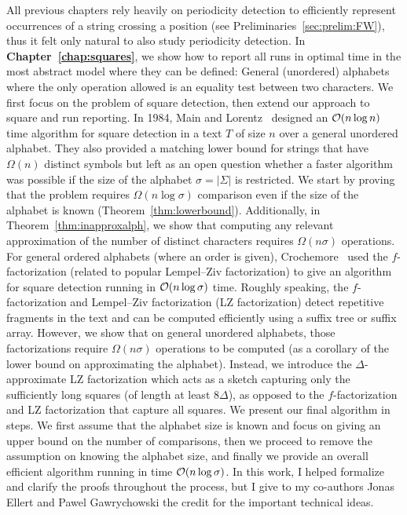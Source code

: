 All previous chapters rely heavily on periodicity detection to efficiently represent occurrences of a string crossing a position (see Preliminaries~\ref{sec:prelim:FW}), thus it felt only natural to also study periodicity detection. In \textbf{Chapter~\ref{chap:squares}}, we show how to report all runs  in optimal time in the most abstract model where they can be defined: General (unordered) alphabets where the only operation allowed is an equality test between two characters. 
We first focus on the problem of square detection, then extend our approach to square and run reporting.
In 1984, Main and Lorentz~\cite{Main1984} designed an $\mathcal{O}(n\log n)$ time algorithm for square detection in a text $T$ of size $n$ over a general unordered alphabet. They also provided a matching lower bound for strings that have $\Omega(n)$ distinct symbols but left as an open question whether a faster algorithm was possible if the size of the alphabet $\sigma=|\Sigma|$ is restricted.
We start by proving that the problem requires $\Omega(n \log \sigma)$ comparison even if the size of the alphabet is known (Theorem~\ref{thm:lowerbound}). Additionally, in Theorem~\ref{thm:inapproxalph}, we show that computing any relevant approximation of the number of distinct characters requires $\Omega(n\sigma)$ operations.
For general ordered alphabets (where an order is given), Crochemore~\cite{Crochemore1986} used the $f$-factorization (related to popular Lempel--Ziv factorization) to give an algorithm for square detection running in $\mathcal{O}(n\log \sigma)$ time. Roughly speaking, the $f$-factorization and Lempel--Ziv factorization (LZ factorization) detect repetitive fragments in the text and can be computed efficiently using a suffix tree or suffix array. However,  we show that on general unordered alphabets, those factorizations require $\Omega(n\sigma)$ operations to be computed (as a corollary of the lower bound on approximating the alphabet). %
Instead, we introduce the $\Delta$-approximate LZ factorization which acts as a sketch capturing only the sufficiently long squares (of length at least $8\Delta$), as opposed to the $f$-factorization and LZ factorization that capture all squares.
We present our final algorithm in steps. We first assume that the alphabet size is known and focus on giving an upper bound on the number of comparisons, then we proceed to remove the assumption on knowing the alphabet size, and finally we provide an overall efficient algorithm running in time $\mathcal{O}(n\log\sigma)$.
In this work, I helped formalize and clarify the proofs throughout the process, but I give to my co-authors Jonas Ellert and Pawel Gawrychowski the credit for the important technical ideas.




